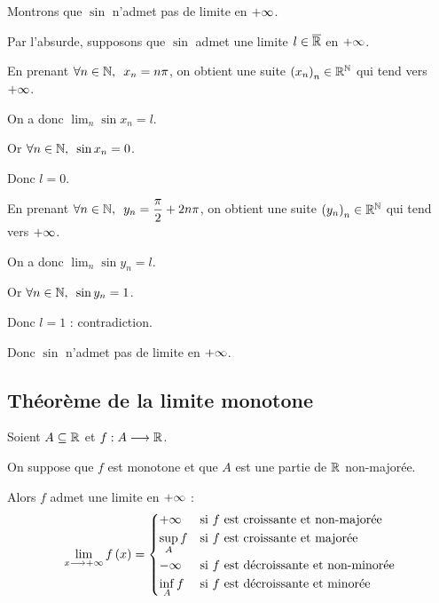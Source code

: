 \begin{ex}
Montrons que \(\sin\) n'admet pas de limite en \(+\infty\).

Par l'absurde, supposons que \(\sin\) admet une limite \(l\in\overline{\mathbb{R}}\) en \(+\infty\).

En prenant \(\quantifs{\forall n\in\N}x_n=n\pi\), on obtient une suite \(\left(x_n\right)_n\in\mathbb{R}^{\mathbb{N}}\) qui tend vers \(+\infty\).

On a donc \(\lim_n\sin x_n=l\).

Or \(\quantifs{\forall n\in\N}\sin x_n=0\).

Donc \(l=0\).

En prenant \(\quantifs{\forall n\in\N}y_n=\dfrac{\pi}{2}+2n\pi\), on obtient une suite \(\left(y_n\right)_n\in\mathbb{R}^{\mathbb{N}}\) qui tend vers \(+\infty\).

On a donc \(\lim_n\sin y_n=l\).

Or \(\quantifs{\forall n\in\N}\sin y_n=1\).

Donc \(l=1\) : contradiction.

Donc \(\sin\) n'admet pas de limite en \(+\infty\).
\end{ex}

\subsection{Théorème de la limite monotone}

\begin{theo}
Soient \(A\subseteq\mathbb{R}\) et \(f:A\longrightarrow\mathbb{R}\).

On suppose que \(f\) est monotone et que \(A\) est une partie de \(\mathbb{R}\) non-majorée.

Alors \(f\) admet une limite en \(+\infty\) : \[\lim_{x\longrightarrow+\infty}f\left(x\right)=\begin{dcases}
+\infty &\text{si \(f\) est croissante et non-majorée} \\
\sup_Af &\text{si \(f\) est croissante et majorée} \\
-\infty &\text{si \(f\) est décroissante et non-minorée} \\
\inf_Af &\text{si \(f\) est décroissante et minorée}
\end{dcases}\]
\end{theo}


